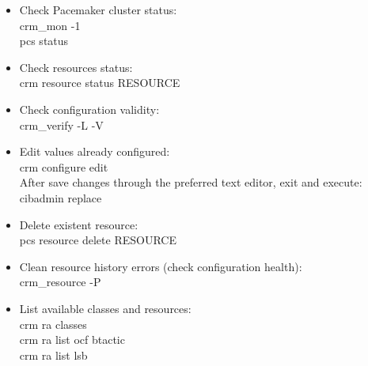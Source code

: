 \documentclass[a4paper, 12pt]{book}
\begin{document}
\begin{itemize}
	\item Check Pacemaker cluster status:\\
		crm\_mon -1\\
		pcs status\\
\end{itemize}

\begin{itemize}
	\item Check resources status:\\
		crm resource status RESOURCE\\
\end{itemize}

\begin{itemize}
	\item Check configuration validity:\\
		crm\_verify -L -V\\
\end{itemize}

\begin{itemize}
	\item Edit values already configured:\\
		crm configure edit\\
	After save changes through the preferred text editor, exit and execute:\\
		cibadmin \textminus \textminus replace\\
\end{itemize}

\begin{itemize}
	\item Delete existent resource:\\
		pcs resource delete RESOURCE\\
\end{itemize}

\begin{itemize}
	\item Clean resource history errors (check configuration health):\\
		crm\_resource -P\\
\end{itemize}

\begin{itemize}
	\item List available classes and resources:\\
		crm ra classes\\
		crm ra list ocf btactic\\
		crm ra list lsb\\
\end{itemize}
\end{document}

